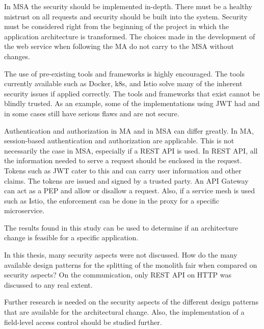 \begin{sloppypar}
    In MSA the security should be implemented in-depth. There must be a healthy
    mistrust on all requests and security should be built into the system.
    Security must be considered right from the beginning of the project in which
    the application architecture is transformed. The choices made in the
    development of the web service when following the MA do not carry to the MSA
    without changes.
\end{sloppypar}
\begin{sloppypar}
    The use of pre-existing tools and frameworks is highly encouraged. The tools
    currently available such as Docker, k8s, and Istio solve many of the
    inherent security issues if applied correctly. The tools and frameworks that
    exist cannot be blindly trusted. As an example, some of the implementations
    using JWT had and in some cases still have serious flaws and are not secure.
\end{sloppypar}
\begin{sloppypar}
    Authentication and authorization in MA and in MSA can differ greatly. In MA,
    session-based authentication and authorization are applicable. This is not
    necessarily the case in MSA, especially if a REST API is used. In REST API, all the
    information needed to serve a request should be enclosed in the request.
    Tokens such as JWT cater to this and can carry user information and other
    claims. The tokens are issued and signed by a trusted party. An API Gateway
    can act as a PEP and allow or disallow a request. Also, if a service mesh is
    used such as Istio, the enforcement can be done in the proxy for a specific
    microservice.
\end{sloppypar}
\begin{sloppypar}
    The results found in this study can be used to determine if an
    architecture change is feasible for a specific application.
\end{sloppypar}
\begin{sloppypar}
    In this thesis, many security aspects were not discussed. How do the many
    available design patterns for the splitting of the monolith fair when
    compared on security aspects? On the communication, only REST API on HTTP was
    discussed to any real extent.
\end{sloppypar}
\begin{sloppypar}
    Further research is needed on the security aspects of the different design
    patterns that are available for the architectural change. Also, the
    implementation of a field-level access control should be studied further.
\end{sloppypar}

